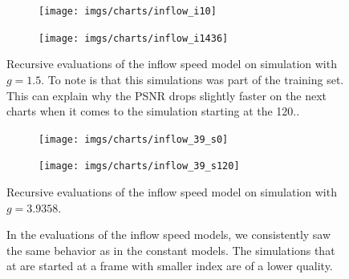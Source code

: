 \documentclass{llncs}
\begin{document}
\begin{figure}
  \begin{subfigure}{.5\textwidth}
    \centering
    \texttt{[image: imgs/charts/inflow\_i10]}
  \end{subfigure}
  \begin{subfigure}{.5\textwidth}
    \centering
    \texttt{[image: imgs/charts/inflow\_i1436]}
  \end{subfigure}
  \begin{center}
    Recursive evaluations of the inflow speed model on simulation with $g=1.5$. To note is that this simulations was part of the training set. This can explain why the PSNR drops slightly faster on the next charts when it comes to the simulation starting at the 120.\@frame.
  \end{center}
  \begin{subfigure}{.5\textwidth}
    \centering
    \texttt{[image: imgs/charts/inflow\_39\_s0]}
  \end{subfigure}
  \begin{subfigure}{.5\textwidth}
    \centering
    \texttt{[image: imgs/charts/inflow\_39\_s120]}
  \end{subfigure}
  \begin{center}
    Recursive evaluations of the inflow speed model on simulation with $g=3.9358$.
  \end{center}
  \caption{In the evaluations of the inflow speed models, we consistently saw the same behavior as in the constant models. The simulations that at are started at a frame with smaller index are of a lower quality.}\label{fig:rec_speed_psnr}
\end{figure}
\end{document}
